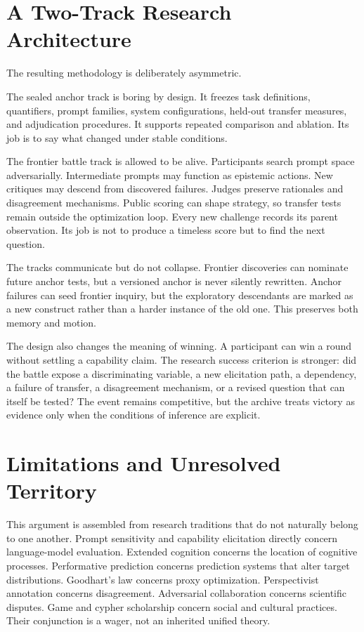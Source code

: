 \documentclass[11pt]{article}
\begin{document}
\section{A Two-Track Research Architecture}
The resulting methodology is deliberately asymmetric.

The sealed anchor track is boring by design. It freezes task definitions, quantifiers, prompt families, system configurations, held-out transfer measures, and adjudication procedures. It supports repeated comparison and ablation. Its job is to say what changed under stable conditions.

The frontier battle track is allowed to be alive. Participants search prompt space adversarially. Intermediate prompts may function as epistemic actions. New critiques may descend from discovered failures. Judges preserve rationales and disagreement mechanisms. Public scoring can shape strategy, so transfer tests remain outside the optimization loop. Every new challenge records its parent observation. Its job is not to produce a timeless score but to find the next question.

The tracks communicate but do not collapse. Frontier discoveries can nominate future anchor tests, but a versioned anchor is never silently rewritten. Anchor failures can seed frontier inquiry, but the exploratory descendants are marked as a new construct rather than a harder instance of the old one. This preserves both memory and motion.

The design also changes the meaning of winning. A participant can win a round without settling a capability claim. The research success criterion is stronger: did the battle expose a discriminating variable, a new elicitation path, a dependency, a failure of transfer, a disagreement mechanism, or a revised question that can itself be tested? The event remains competitive, but the archive treats victory as evidence only when the conditions of inference are explicit.

\section{Limitations and Unresolved Territory}
This argument is assembled from research traditions that do not naturally belong to one another. Prompt sensitivity and capability elicitation directly concern language-model evaluation. Extended cognition concerns the location of cognitive processes. Performative prediction concerns prediction systems that alter target distributions. Goodhart's law concerns proxy optimization. Perspectivist annotation concerns disagreement. Adversarial collaboration concerns scientific disputes. Game and cypher scholarship concern social and cultural practices. Their conjunction is a wager, not an inherited unified theory.
\end{document}
